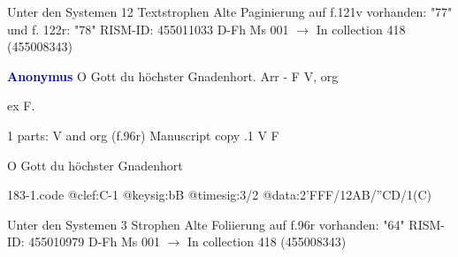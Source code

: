 \documentclass[twocolumn]{book}
\begin{document}
\newline Unter den Systemen 12 Textstrophen
\newline Alte Paginierung auf f.121v vorhanden: "77" und f. 122r: "78"
\newline RISM-ID: 455011033
\newline D-Fh  Ms 001
\newline $\rightarrow$ In collection 418 (455008343)
      
\newline \par \vspace{7pt} \textcolor{darkblue}{\textbf{Anonymus  }}
\newline O Gott du höchster Gnadenhort. Arr - F
\newline V, org
\newline \begin{itshape}[f.96r, at left:] ex F.\end{itshape} 
\newline \textcolor{darkblue}{}  1 parts: V and org  (f.96r)
\newline Manuscript copy
.1  V  F
\newline \begin{footnotesize} O Gott du höchster Gnadenhort \end{footnotesize}  
\begin{filecontents*}{183-1.code}
@clef:C-1
@keysig:bB
@timesig:3/2
@data:2'FFF/12AB/''CD/1(C)
\end{filecontents*}
\newline
%

\newline Unter den Systemen 3 Strophen
\newline Alte Foliierung auf f.96r vorhanden: "64"
\newline RISM-ID: 455010979
\newline D-Fh  Ms 001
\newline $\rightarrow$ In collection 418 (455008343)
      
\end{document}
